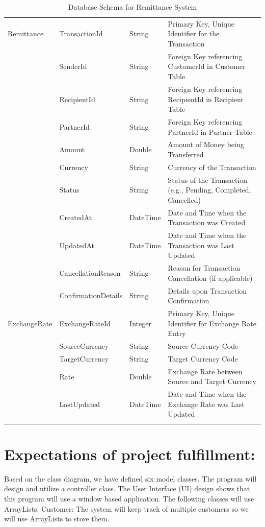 \documentclass[onecolumn, letterpaper, ]{report}
\begin{document}
\begin{longtable}{|l|l|l|p{5cm}|}
\hline
Remittance & TransactionId & String & Primary Key, Unique Identifier for the Transaction \\
 & SenderId & String & Foreign Key referencing CustomerId in Customer Table \\
 & RecipientId & String & Foreign Key referencing RecipientId in Recipient Table \\
 & PartnerId & String & Foreign Key referencing PartnerId in Partner Table \\
 & Amount & Double & Amount of Money being Transferred \\
 & Currency & String & Currency of the Transaction \\
 & Status & String & Status of the Transaction (e.g., Pending, Completed, Cancelled) \\
 & CreatedAt & DateTime & Date and Time when the Transaction was Created \\
 & UpdatedAt & DateTime & Date and Time when the Transaction was Last Updated \\
 & CancellationReason & String & Reason for Transaction Cancellation (if applicable) \\
 & ConfirmationDetails & String & Details upon Transaction Confirmation \\
\hline
ExchangeRate & ExchangeRateId & Integer & Primary Key, Unique Identifier for Exchange Rate Entry \\
 & SourceCurrency & String & Source Currency Code \\
 & TargetCurrency & String & Target Currency Code \\
 & Rate & Double & Exchange Rate between Source and Target Currency \\
 & LastUpdated & DateTime & Date and Time when the Exchange Rate was Last Updated \\
\hline
\caption{Database Schema for Remittance System}
\end{longtable}
        

    \section{\colorbox{white!95!black}{Expectations of project fulfillment:}} 

    Based on the class diagram, we have defined six model classes. The program will design and utilize a controller class. The User Interface (UI) design shows that this program will use a window based application. The following classes will use ArrayLists:
Customer: The system will keep track of multiple customers so we will use ArrayLists to store them.
\end{document}
